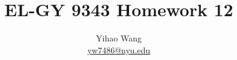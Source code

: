 \documentclass[en, 12pt, a4paper]{0elegantpaper}
\author{Yihao Wang \\ \href{mailto:yw7486@nyu.edu}{yw7486@nyu.edu}} %
\newcommand{\HWIndex}{12}
\begin{document}
\title{EL-GY 9343 Homework \HWIndex}
\maketitle


\end{document}
